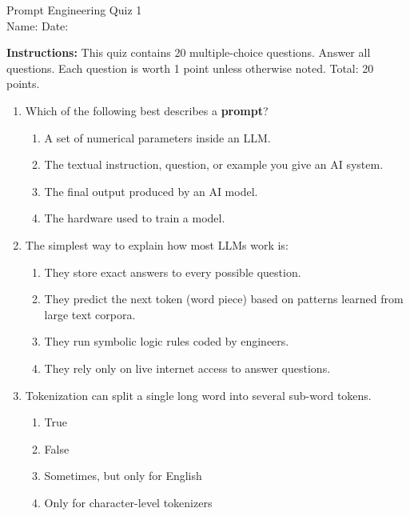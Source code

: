 \documentclass[11pt,a4paper]{article}
\begin{document}
\begin{center}
  {\LARGE Prompt Engineering \textemdash{} Quiz 1}\\[6pt]
  {\large Name: \underline{\hspace{6cm}} \quad Date: \underline{\hspace{3cm}}}
\end{center}
\vspace{0.5cm}

\textbf{Instructions:} This quiz contains 20 multiple-choice questions. Answer all questions. Each question is worth 1 point unless otherwise noted. Total: 20 points.
\vspace{0.5cm}
\begin{enumerate}[leftmargin=*, label=\textbf{\#\arabic*}]

  \item Which of the following best describes a \textbf{prompt}?\\
    \begin{enumerate}[label=\Alph*)]
      \item A set of numerical parameters inside an LLM.
      \item The textual instruction, question, or example you give an AI system.
      \item The final output produced by an AI model.
      \item The hardware used to train a model.
    \end{enumerate}

  \item The simplest way to explain how most LLMs work is:\\
    \begin{enumerate}[label=\Alph*)]
      \item They store exact answers to every possible question.
      \item They predict the next token (word piece) based on patterns learned from large text corpora.
      \item They run symbolic logic rules coded by engineers.
      \item They rely only on live internet access to answer questions.
    \end{enumerate}

  \item Tokenization can split a single long word into several sub-word tokens.\\
    \begin{enumerate}[label=\Alph*)]
      \item True
      \item False
      \item Sometimes, but only for English
      \item Only for character-level tokenizers
    \end{enumerate}


\end{enumerate}
\end{document}

